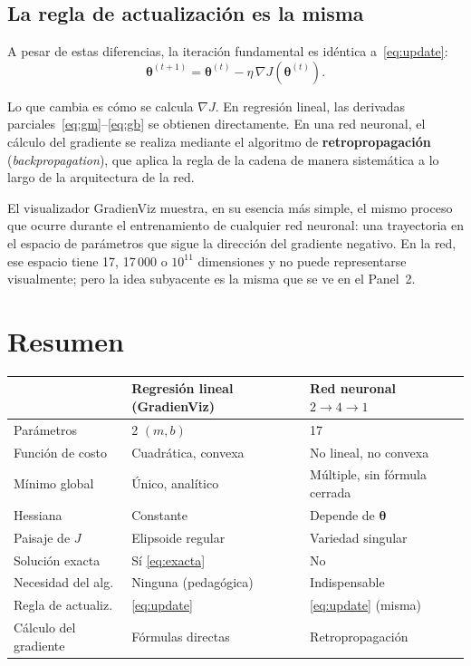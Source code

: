 \documentclass[12pt, a4paper]{article}
\newcommand{\grad}{\nabla}
\begin{document}
\subsection{La regla de actualización es la misma}

A pesar de estas diferencias, la iteración fundamental es idéntica a~\eqref{eq:update}:
\[
  \boldsymbol{\theta}^{(t+1)} = \boldsymbol{\theta}^{(t)}
    - \eta\,\grad J\!\left(\boldsymbol{\theta}^{(t)}\right).
\]

Lo que cambia es cómo se calcula $\grad J$.
En regresión lineal, las derivadas parciales~\eqref{eq:gm}--\eqref{eq:gb}
se obtienen directamente. En una red neuronal, el cálculo del gradiente
se realiza mediante el algoritmo de \textbf{retropropagación}
(\emph{backpropagation}), que aplica la regla de la cadena de manera
sistemática a lo largo de la arquitectura de la red.

El visualizador GradienViz muestra, en su esencia más simple, el mismo
proceso que ocurre durante el entrenamiento de cualquier red neuronal:
una trayectoria en el espacio de parámetros que sigue la dirección del
gradiente negativo. En la red, ese espacio tiene 17, 17\,000 o $10^{11}$
dimensiones y no puede representarse visualmente; pero la idea subyacente
es la misma que se ve en el Panel~2.

\section*{Resumen}

\begin{center}
\begin{tabular}{lll}
  \toprule
  & \textbf{Regresión lineal (GradienViz)} & \textbf{Red neuronal $2\to 4\to 1$} \\
  \midrule
  Parámetros          & 2 $(m, b)$          & 17 \\
  Función de costo    & Cuadrática, convexa & No lineal, no convexa \\
  Mínimo global       & Único, analítico    & Múltiple, sin fórmula cerrada \\
  Hessiana            & Constante           & Depende de $\boldsymbol{\theta}$ \\
  Paisaje de $J$      & Elipsoide regular   & Variedad singular \\
  Solución exacta     & Sí \eqref{eq:exacta} & No \\
  Necesidad del alg.  & Ninguna (pedagógica) & Indispensable \\
  Regla de actualiz.  & \eqref{eq:update}   & \eqref{eq:update} (misma) \\
  Cálculo del gradiente & Fórmulas directas & Retropropagación \\
  \bottomrule
\end{tabular}
\end{center}
\end{document}

